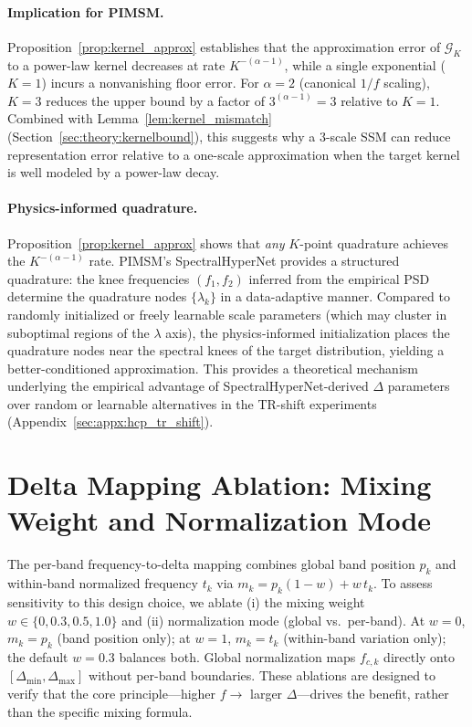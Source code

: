 \documentclass{article}
\begin{document}
\paragraph{Implication for PIMSM.}
Proposition~\ref{prop:kernel_approx} establishes that the approximation error of $\mathcal{G}_K$ to a power-law kernel decreases at rate $K^{-(\alpha-1)}$, while a single exponential ($K=1$) incurs a nonvanishing floor error.
For $\alpha = 2$ (canonical $1/f$ scaling), $K = 3$ reduces the upper bound by a factor of $3^{(\alpha-1)} = 3$ relative to $K=1$.
Combined with Lemma~\ref{lem:kernel_mismatch} (Section~\ref{sec:theory:kernelbound}), this suggests why a 3-scale SSM can reduce representation error relative to a one-scale approximation when the target kernel is well modeled by a power-law decay.

\paragraph{Physics-informed quadrature.}
Proposition~\ref{prop:kernel_approx} shows that \emph{any} $K$-point quadrature achieves the $K^{-(\alpha-1)}$ rate.
PIMSM's SpectralHyperNet provides a structured quadrature: the knee frequencies $(f_1, f_2)$ inferred from the empirical PSD determine the quadrature nodes $\{\lambda_k\}$ in a data-adaptive manner.
Compared to randomly initialized or freely learnable scale parameters (which may cluster in suboptimal regions of the $\lambda$ axis), the physics-informed initialization places the quadrature nodes near the spectral knees of the target distribution, yielding a better-conditioned approximation.
This provides a theoretical mechanism underlying the empirical advantage of SpectralHyperNet-derived $\Delta$ parameters over random or learnable alternatives in the TR-shift experiments (Appendix~\ref{sec:appx:hcp_tr_shift}).

\section{Delta Mapping Ablation: Mixing Weight and Normalization Mode}
\label{sec:appx:delta_ablation}

The per-band frequency-to-delta mapping combines global band position $p_k$ and within-band normalized frequency $t_k$ via $m_k = p_k(1-w) + w\,t_k$. To assess sensitivity to this design choice, we ablate (i) the mixing weight $w \in \{0, 0.3, 0.5, 1.0\}$ and (ii) normalization mode (global vs.\ per-band). At $w=0$, $m_k = p_k$ (band position only); at $w=1$, $m_k = t_k$ (within-band variation only); the default $w=0.3$ balances both. Global normalization maps $f_{c,k}$ directly onto $[\Delta_{\min}, \Delta_{\max}]$ without per-band boundaries. These ablations are designed to verify that the core principle---higher $f \to$ larger $\Delta$---drives the benefit, rather than the specific mixing formula.
\end{document}
